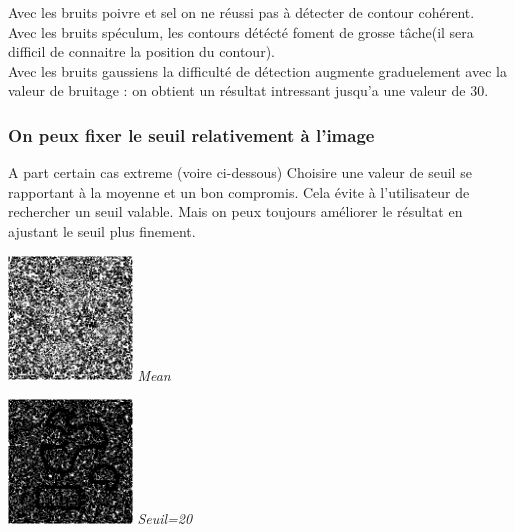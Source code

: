 \documentclass[a4,12pt]{article}
\begin{document}
Avec les bruits poivre et sel on ne réussi pas à détecter de contour cohérent.\\
Avec les bruits spéculum, les contours détécté foment de grosse tâche(il sera difficil de connaitre la position du contour).\\
Avec les bruits gaussiens la difficulté de détection augmente graduelement avec la valeur de bruitage : on obtient un résultat intressant jusqu'a une valeur de 30.\\

\subsubsection{On peux fixer le seuil relativement à l'image}
A part certain cas extreme (voire ci-dessous) Choisire une valeur de seuil se rapportant à la moyenne
et un bon compromis. Cela évite à l'utilisateur de rechercher un seuil valable.
Mais on peux toujours améliorer le résultat en ajustant le seuil plus finement.\\
\noindent
\begin{center}
\begin{minipage}[c]{0.20\linewidth}
	\begin{center}
		\includegraphics[width = 33mm]{./img/p2test_grad_mean_formes1pets5.jpg}
		\textit{Mean}
	\end{center}
\end{minipage}
\begin{minipage}[c]{0.20\linewidth}
	\begin{center}
		\includegraphics[width = 33mm]{./img/p2test_grad_const_formes1pets5.jpg}
		\textit{Seuil=20}
	\end{center}
\end{minipage}
\end{center}
\end{document}
